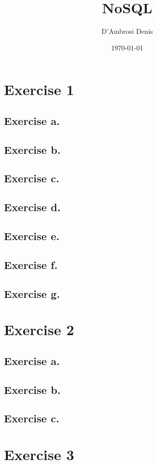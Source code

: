 \documentclass{article}
\title{NoSQL}
\author{D'Ambrosi Denis}
\date{\today} %
\begin{document}
\maketitle
\clearpage

\section*{Exercise 1}

\subsection*{Exercise a.}


\subsection*{Exercise b.}


\subsection*{Exercise c.}


\subsection*{Exercise d.}


\subsection*{Exercise e.}


\subsection*{Exercise f.}


\subsection*{Exercise g.}


\clearpage

\section*{Exercise 2}

\subsection*{Exercise a.}


\subsection*{Exercise b.}


\subsection*{Exercise c.}

\clearpage

\section*{Exercise 3}

\end{document}
